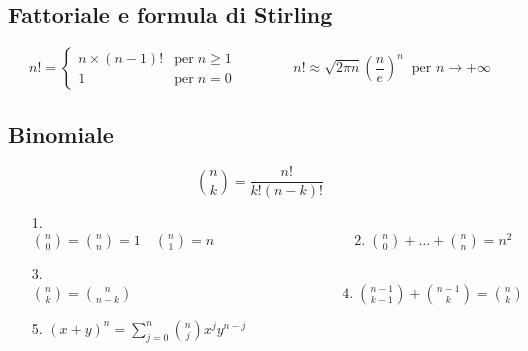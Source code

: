 \documentclass[a4paper]{article}
\begin{document}
\subsection*{Fattoriale e formula di Stirling}
\[n! = \begin{cases}
	n \times (n-1)! & \text{per} \; n \geq 1 \\
	1 & \text{per} \; n = 0
\end{cases} \qquad \qquad n! \approx \sqrt{2 \pi n} \left(\frac{n}{e}\right)^n \;\; \text{per } n \to +\infty\]

\subsection*{Binomiale}
\[\binom{n}{k} = \frac{n!}{k! (n-k)!}\]
\begin{itemize}
	\item[1.] \(\displaystyle \binom{n}{0} = \binom{n}{n} = 1 \quad \binom{n}{1} = n \qquad \qquad \qquad \qquad \qquad \text{2.} \; \binom{n}{0} + \dots + \binom{n}{n} = n^2\)
	\item[3.] \(\displaystyle \binom{n}{k} = \binom{n}{n-k} \qquad \qquad \qquad\qquad \qquad \qquad \qquad \quad \text{4.} \;\binom{n-1}{k-1} + \binom{n-1}{k} = \binom{n}{k}\)
	\item[5.] \(\displaystyle (x+y)^n = \sum_{j=0}^n \binom{n}{j} x^j y^{n-j}\)
\end{itemize}
\end{document}
